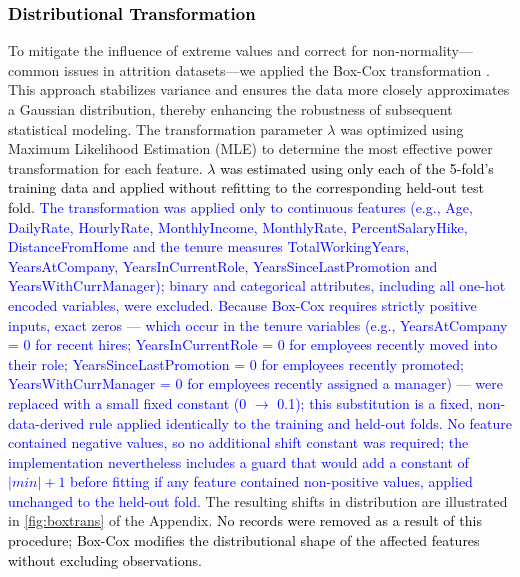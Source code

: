 \documentclass[a4paper,fleqn]{cas-sc}
\begin{document}
\subsubsection{\textcolor{black}{Distributional Transformation}}
To mitigate the influence of extreme values and correct for non-normality—common issues in attrition datasets—we applied the Box-Cox transformation \cite{Box1964}. This approach stabilizes variance and ensures the data more closely approximates a Gaussian distribution, thereby enhancing the robustness of subsequent statistical modeling. The transformation parameter $\lambda$ was optimized using Maximum Likelihood Estimation (MLE) to determine the most effective power transformation for each feature. \textcolor{black}{$\lambda$ was estimated using only each of the 5-fold's training data and applied without refitting to the corresponding held-out test fold}. \textcolor{blue}{The transformation was applied only to continuous features (e.g., Age, DailyRate, HourlyRate, MonthlyIncome, MonthlyRate, PercentSalaryHike, DistanceFromHome and the tenure measures TotalWorkingYears, YearsAtCompany, YearsInCurrentRole, YearsSinceLastPromotion and YearsWithCurrManager); binary and categorical attributes, including all one-hot encoded variables, were excluded. Because Box-Cox requires strictly positive inputs, exact zeros — which occur in the tenure variables (e.g., YearsAtCompany = 0 for recent hires; YearsInCurrentRole = 0 for employees recently moved into their role; YearsSinceLastPromotion = 0 for employees recently promoted; YearsWithCurrManager = 0 for employees recently assigned a manager) — were replaced with a small fixed constant (0 $\rightarrow$ 0.1); this substitution is a fixed, non-data-derived rule applied identically to the training and held-out folds. No feature contained negative values, so no additional shift constant was required; the implementation nevertheless includes a guard that would add a constant of $|min| + 1$ before fitting if any feature contained non-positive values, applied unchanged to the held-out fold.} The resulting shifts in distribution are illustrated in \cref{fig:boxtrans} of the Appendix. \textcolor{black}{No records were removed as a result of this procedure; Box-Cox modifies the distributional shape of the affected features without excluding observations.}
\end{document}

